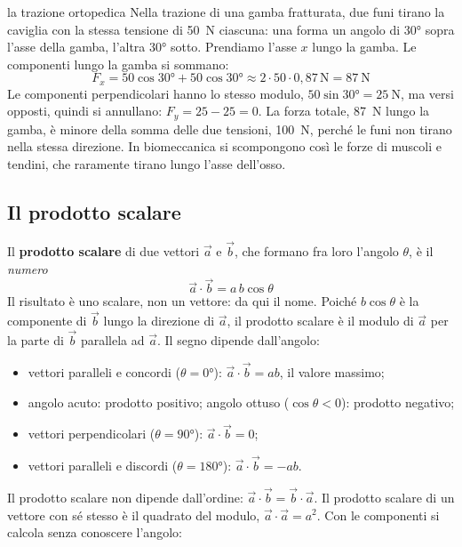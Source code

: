 \begin{applicazione}{la trazione ortopedica}
Nella trazione di una gamba fratturata, due funi tirano la caviglia con la stessa tensione di \SI{50}{\newton} ciascuna: una forma un angolo di \ang{30} sopra l'asse della gamba, l'altra \ang{30} sotto. Prendiamo l'asse $x$ lungo la gamba. Le componenti lungo la gamba si sommano:
\[
  F_x = 50 \cos\ang{30} + 50 \cos\ang{30} \approx 2 \cdot 50 \cdot 0{,}87\,\si{\newton} = \SI{87}{\newton}
\]
Le componenti perpendicolari hanno lo stesso modulo, $50 \sin\ang{30} = \SI{25}{\newton}$, ma versi opposti, quindi si annullano: $F_y = 25 - 25 = 0$. La forza totale, \SI{87}{\newton} lungo la gamba, è minore della somma delle due tensioni, \SI{100}{\newton}, perché le funi non tirano nella stessa direzione. In biomeccanica si scompongono così le forze di muscoli e tendini, che raramente tirano lungo l'asse dell'osso.
\end{applicazione}



\subsection{Il prodotto scalare}

Il \textbf{prodotto scalare} di due vettori $\vec a$ e $\vec b$, che formano fra loro l'angolo $\theta$, è il \emph{numero}
\[
  \vec a \cdot \vec b = a\,b\cos\theta
\]
Il risultato è uno scalare, non un vettore: da qui il nome. Poiché $b\cos\theta$ è la componente di $\vec b$ lungo la direzione di $\vec a$, il prodotto scalare è il modulo di $\vec a$ per la parte di $\vec b$ parallela ad $\vec a$. Il segno dipende dall'angolo:
\begin{itemize}
  \item vettori paralleli e concordi ($\theta = \ang{0}$): $\vec a \cdot \vec b = ab$, il valore massimo;
  \item angolo acuto: prodotto positivo; angolo ottuso ($\cos\theta < 0$): prodotto negativo;
  \item vettori perpendicolari ($\theta = \ang{90}$): $\vec a \cdot \vec b = 0$;
  \item vettori paralleli e discordi ($\theta = \ang{180}$): $\vec a \cdot \vec b = -ab$.
\end{itemize}
Il prodotto scalare non dipende dall'ordine: $\vec a \cdot \vec b = \vec b \cdot \vec a$. Il prodotto scalare di un vettore con sé stesso è il quadrato del modulo, $\vec a \cdot \vec a = a^{2}$. Con le componenti si calcola senza conoscere l'angolo:

